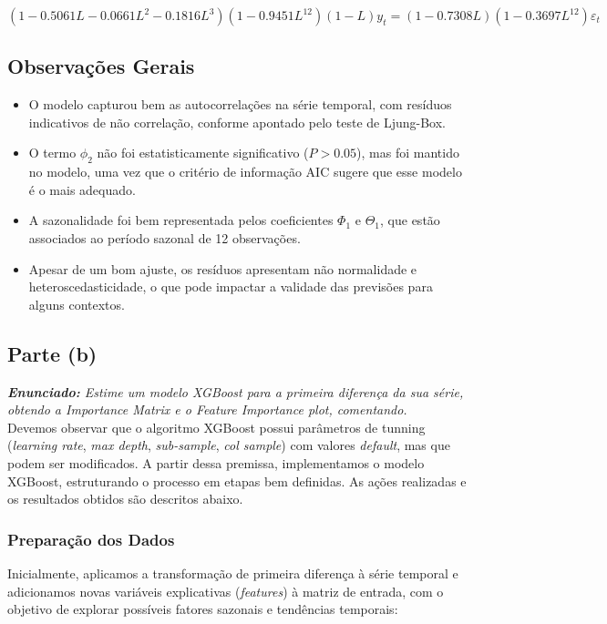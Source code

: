 \documentclass[a4paper, 12pt]{article}
\begin{document}
\[
(1 - 0.5061L - 0.0661L^2 - 0.1816L^3)(1-0.9451L^{12})(1 - L)y_t = (1-0.7308L)(1 - 0.3697L^{12})\varepsilon_t
\]

\subsection*{Observações Gerais}
\begin{itemize}
    \item O modelo capturou bem as autocorrelações na série temporal, com resíduos indicativos de não correlação, conforme apontado pelo teste de Ljung-Box.
    \item O termo \( \phi_2 \) não foi estatisticamente significativo (\(P > 0.05\)), mas foi mantido no modelo, uma vez que o critério de informação AIC sugere que esse modelo é o mais adequado.
    \item A sazonalidade foi bem representada pelos coeficientes \( \Phi_1 \) e \( \Theta_1 \), que estão associados ao período sazonal de 12 observações.
    \item Apesar de um bom ajuste, os resíduos apresentam não normalidade e heteroscedasticidade, o que pode impactar a validade das previsões para alguns contextos.
\end{itemize}


\subsection{Parte (b)}
\textit{\textbf{Enunciado:} Estime um modelo XGBoost para a primeira diferença da sua série, obtendo a Importance Matrix e o Feature Importance plot, comentando.}\\

Devemos observar que o algoritmo XGBoost possui parâmetros de tunning (\textit{learning rate}, \textit{max depth}, \textit{sub-sample}, \textit{col sample}) com valores \textit{default}, mas que podem ser modificados. A partir dessa premissa, implementamos o modelo XGBoost, estruturando o processo em etapas bem definidas. As ações realizadas e os resultados obtidos são descritos abaixo.

\subsubsection{Preparação dos Dados}
Inicialmente, aplicamos a transformação de primeira diferença à série temporal e adicionamos novas variáveis explicativas (\textit{features}) à matriz de entrada, com o objetivo de explorar possíveis fatores sazonais e tendências temporais:
\end{document}

